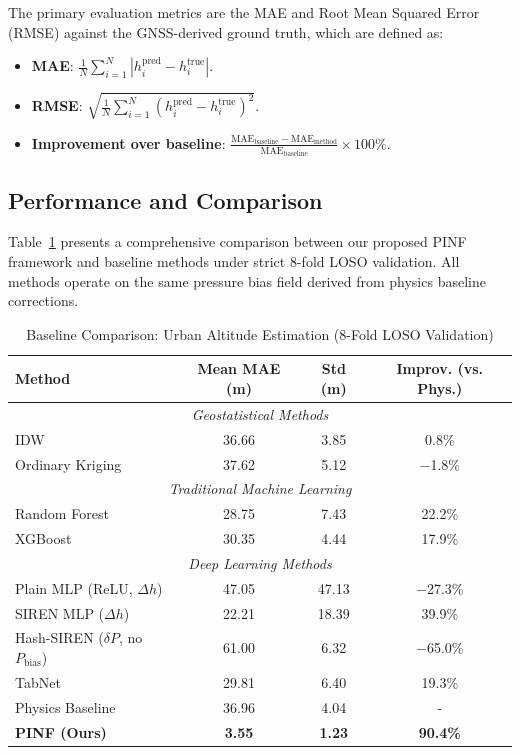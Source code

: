The primary evaluation metrics are the MAE and Root Mean Squared Error (RMSE) against the GNSS-derived ground truth, which are defined as:
\begin{itemize}
    \item \textbf{MAE}: $\frac{1}{N} \sum_{i=1}^N |h_i^{\text{pred}} - h_i^{\text{true}}|$.
    \item \textbf{RMSE}: $\sqrt{\frac{1}{N} \sum_{i=1}^N (h_i^{\text{pred}} - h_i^{\text{true}})^2}$.
    \item \textbf{Improvement over baseline}: $\frac{\text{MAE}_{\text{baseline}} - \text{MAE}_{\text{method}}}{\text{MAE}_{\text{baseline}}} \times 100\%$.
\end{itemize}

\subsection{Performance and Comparison}
\label{subsec:baseline_comparison}
Table~\ref{tab:baseline_comparison} presents a comprehensive comparison between our proposed PINF framework and baseline methods under strict 8-fold LOSO validation. All methods operate on the same pressure bias field derived from physics baseline corrections.

\begin{table}[htbp]
\caption{Baseline Comparison: Urban Altitude Estimation (8-Fold LOSO Validation)}
\label{tab:baseline_comparison}
\centering
\begin{tabular}{lccc}
\toprule
\textbf{Method} & \textbf{Mean MAE (m)} & \textbf{Std (m)} & \textbf{Improv. (vs. Phys.)} \\
\midrule
\multicolumn{4}{c}{\textit{Geostatistical Methods}} \\
IDW~\cite{shepard1968two} & 36.66 & 3.85 & 0.8\% \\
Ordinary Kriging~\cite{cressie1993statistics} & 37.62 & 5.12 & $-$1.8\% \\
\midrule
\multicolumn{4}{c}{\textit{Traditional Machine Learning}} \\
Random Forest~\cite{breiman2001random} & 28.75 & 7.43 & 22.2\% \\
XGBoost~\cite{chen2016xgboost} & 30.35 & 4.44 & 17.9\% \\
\midrule
\multicolumn{4}{c}{\textit{Deep Learning Methods}} \\
Plain MLP (ReLU, $\Delta h$) & 47.05 & 47.13 & $-$27.3\% \\
SIREN MLP ($\Delta h$)~\cite{sitzmann2020implicit} & 22.21 & 18.39 & 39.9\% \\
Hash-SIREN ($\delta P$, no $P_{\text{bias}}$) & 61.00 & 6.32 & $-$65.0\% \\
TabNet~\cite{arik2021tabnet} & 29.81 & 6.40 & 19.3\% \\
\midrule
Physics Baseline & 36.96 & 4.04 & - \\
\midrule
\textbf{PINF (Ours)} & \textbf{3.55} & \textbf{1.23} & \textbf{90.4\%} \\
\bottomrule
\end{tabular}
\end{table}

